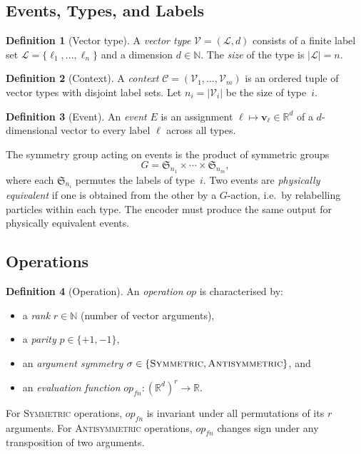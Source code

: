 \documentclass[11pt,a4paper]{article}
\theoremstyle{definition}
\newtheorem{definition}{Definition}[section]
\theoremstyle{plain}
\theoremstyle{remark}
\newcommand{\R}{\mathbb{R}}
\newcommand{\N}{\mathbb{N}}
\newcommand{\Sym}{\mathfrak{S}}
\begin{document}
\subsection{Events, Types, and Labels}

\begin{definition}[Vector type]
A \emph{vector type} $\mathcal{V} = (\mathcal{L}, d)$ consists of a finite
label set $\mathcal{L} = \{\ell_1,\ldots,\ell_n\}$ and a dimension $d \in
\N$.  The \emph{size} of the type is $|\mathcal{L}| = n$.
\end{definition}

\begin{definition}[Context]
A \emph{context} $\mathcal{C} = (\mathcal{V}_1,\ldots,\mathcal{V}_m)$ is an
ordered tuple of vector types with disjoint label sets.  Let $n_i =
|\mathcal{V}_i|$ be the size of type~$i$.
\end{definition}

\begin{definition}[Event]
An \emph{event} $E$ is an assignment $\ell \mapsto \mathbf{v}_\ell \in \R^d$
of a $d$-dimensional vector to every label $\ell$ across all types.
\end{definition}

The symmetry group acting on events is the product of symmetric groups
\[
  G = \Sym_{n_1} \times \cdots \times \Sym_{n_m},
\]
where each $\Sym_{n_i}$ permutes the labels of type~$i$.  Two events are
\emph{physically equivalent} if one is obtained from the other by a $G$-action,
i.e.\ by relabelling particles within each type.  The encoder must produce the
same output for physically equivalent events.

\subsection{Operations}

\begin{definition}[Operation]
An \emph{operation} $\mathit{op}$ is characterised by:
\begin{itemize}[nosep]
  \item a \emph{rank} $r \in \N$ (number of vector arguments),
  \item a \emph{parity} $p \in \{+1,-1\}$,
  \item an \emph{argument symmetry} $\sigma \in \{\textsc{Symmetric},
    \textsc{Antisymmetric}\}$, and
  \item an \emph{evaluation function} $\mathit{op}_{fn}: (\R^d)^r \to \R$.
\end{itemize}
For \textsc{Symmetric} operations, $\mathit{op}_{fn}$ is invariant under all
permutations of its $r$ arguments.  For \textsc{Antisymmetric} operations,
$\mathit{op}_{fn}$ changes sign under any transposition of two arguments.
\end{definition}
\end{document}
